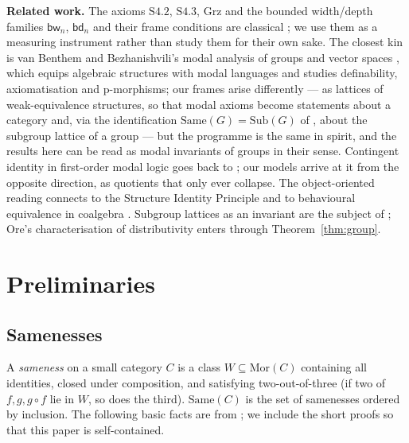 \documentclass[11pt]{amsart}
\theoremstyle{definition}
\newcommand{\Same}{\mathrm{Same}}
\newcommand{\Sub}{\mathrm{Sub}}
\newcommand{\Mor}{\mathrm{Mor}}
\newcommand{\bw}{\mathsf{bw}}
\newcommand{\bd}{\mathsf{bd}}
\newcommand{\Grz}{\mathrm{Grz}}
\begin{document}
\medskip\noindent\textbf{Related work.} The axioms $\mathrm{S4.2}$,
$\mathrm{S4.3}$, $\Grz$ and the bounded width/depth families $\bw_n$, $\bd_n$
and their frame conditions are classical \cite{Fine74,CZ97,BdRV01}; we use them
as a measuring instrument rather than study them for their own sake. The
closest kin is van Benthem and Bezhanishvili's modal analysis of groups and
vector spaces \cite{vBB24}, which equips algebraic structures with modal
languages and studies definability, axiomatisation and p-morphisms; our frames
arise differently --- as lattices of weak-equivalence structures, so that modal
axioms become statements about a category and, via the identification
$\Same(G)=\Sub(G)$ of \cite{SameA}, about the subgroup lattice of a group ---
but the programme is the same in spirit, and the results here can be read as
modal invariants of groups in their sense. Contingent identity in
first-order modal logic goes back to \cite{HC96}; our models arrive at it from
the opposite direction, as quotients that only ever collapse. The
object-oriented reading connects to the Structure Identity Principle
\cite{Univalent} and to behavioural equivalence in coalgebra \cite{Rutten}.
Subgroup lattices as an invariant are the subject of \cite{Schmidt}; Ore's
characterisation of distributivity \cite{Ore} enters through
Theorem~\ref{thm:group}.

\section{Preliminaries}\label{sec:prelim}

\subsection{Samenesses}
A \emph{sameness} on a small category $C$ is a class $W\subseteq\Mor(C)$
containing all identities, closed under composition, and satisfying
two-out-of-three (if two of $f,g,g\circ f$ lie in $W$, so does the third).
$\Same(C)$ is the set of samenesses ordered by inclusion. The following basic
facts are from \cite{SameA}; we include the short proofs so that this paper is
self-contained.
\end{document}
